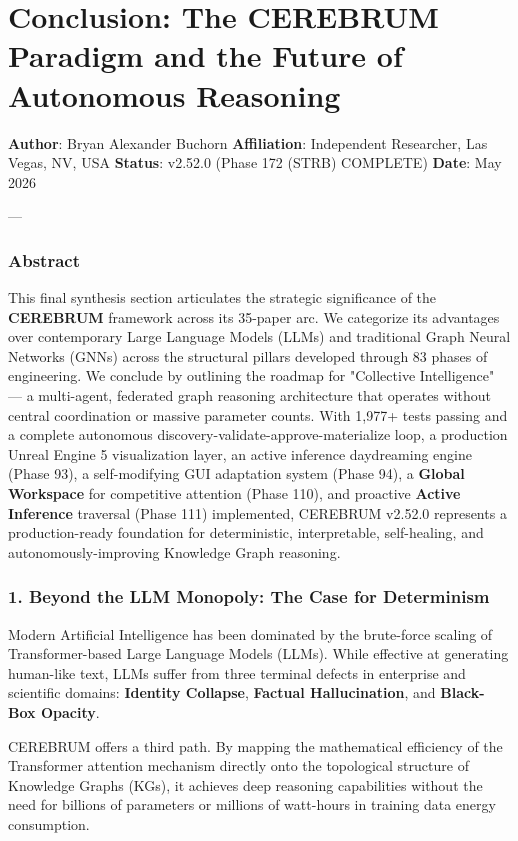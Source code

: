 \section{Conclusion: The CEREBRUM Paradigm and the Future of Autonomous Reasoning}

\textbf{Author}: Bryan Alexander Buchorn  
\textbf{Affiliation}: Independent Researcher, Las Vegas, NV, USA  
\textbf{Status}: v2.52.0 (Phase 172 (STRB) COMPLETE)
\textbf{Date}: May 2026

---

\subsubsection{Abstract}
This final synthesis section articulates the strategic signi\-ficance of the \textbf{CEREBRUM} framework across its 35-paper arc. We categorize its advantages over conte\-mporary Large Language Models (LLMs) and traditional Graph Neural Networks (GNNs) across the structural pillars developed through 83 phases of engineering. We conclude by outlining the roadmap for "Collective Intell\-igence" — a multi-agent, federated graph reasoning archi\-tecture that operates without central coord\-ination or massive parameter counts. With 1,977+ tests passing and a complete autonomous discovery-validate-approve-materialize loop, a production Unreal Engine 5 visua\-lization layer, an active inference daydreaming engine (Phase 93), a self-modifying GUI adaptation system (Phase 94), a \textbf{Global Workspace} for competitive attention (Phase 110), and proactive \textbf{Active Inference} traversal (Phase 111) implemented, CEREBRUM v2.52.0 represents a production-ready foundation for deter\-ministic, inter\-pretable, self-healing, and auton\-omously-improving Knowledge Graph reasoning.

\subsubsection{1. Beyond the LLM Monopoly: The Case for Determinism}
Modern Artificial Intell\-igence has been dominated by the brute-force scaling of Transformer-based Large Language Models (LLMs). While effective at generating human-like text, LLMs suffer from three terminal defects in enterprise and scientific domains: \textbf{Identity Collapse}, \textbf{Factual Halluc\-ination}, and \textbf{Black-Box Opacity}.

CEREBRUM offers a third path. By mapping the mathe\-matical efficiency of the Transformer attention mechanism directly onto the topological structure of Knowledge Graphs (KGs), it achieves deep reasoning capab\-ilities without the need for billions of parameters or millions of watt-hours in training data energy consumption.

